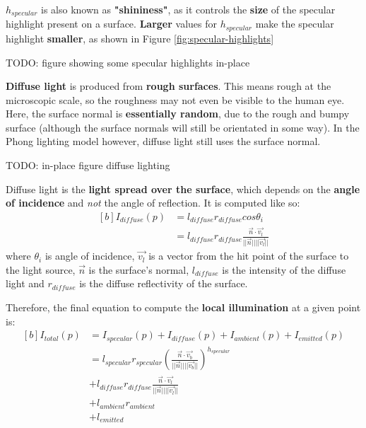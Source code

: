 \documentclass{article}
\begin{document}
$h_{specular}$ is also known as \textbf{"shininess"}, as it controls the \textbf{size} of the specular highlight present on a surface. \textbf{Larger} values for $h_{specular}$ make the specular highlight \textbf{smaller}, as shown in Figure \ref{fig:specular-highlights}

TODO: figure showing some specular highlights in-place

\textbf{Diffuse light} is produced from \textbf{rough surfaces}. This means rough at the microscopic scale, so the roughness may not even be visible to the human eye. Here, the surface normal is \textbf{essentially random}, due to the rough and bumpy surface (although the surface normals will still be orientated in some way). In the Phong lighting model however, diffuse light still uses the surface normal. 

TODO: in-place figure diffuse lighting

Diffuse light is the \textbf{light spread over the surface}, which depends on the \textbf{angle of incidence} and \textit{not} the angle of reflection. It is computed like so:
\begin{equation}
\begin{aligned}[b]
	I_{diffuse}(p) &= l_{diffuse} r_{diffuse} cos \theta_i \\
	&= l_{diffuse} r_{diffuse} \frac{\vec{n} \cdot \vec{v_l}}{||\vec{n}||||\vec{v_l}||}
\end{aligned}
\end{equation}
where $\theta_i$ is angle of incidence, $\vec{v_l}$ is a vector from the hit point of the surface to the light source, $\vec{n}$ is the surface's normal, $l_{diffuse}$ is the intensity of the diffuse light and $r_{diffuse}$ is the diffuse reflectivity of the surface.

Therefore, the final equation to compute the \textbf{local illumination} at a given point is:
\begin{equation}
\begin{aligned}[b]
	I_{total}(p) &= I_{specular}(p) + I_{diffuse}(p) + I_{ambient}(p) + I_{emitted}(p) \\
	&= l_{specular} r_{specular} \left( 
	\frac{\vec{n} \cdot \vec{v_b}}{||\vec{n}||||\vec{v_b}||}
	\right)^{h_{specular}} \\
	&+ l_{diffuse} r_{diffuse} \frac{\vec{n} \cdot \vec{v_l}}{||\vec{n}||||\vec{v_l}||} \\
	&+ l_{ambient} r_{ambient} \\
	&+ l_{emitted} \\
\end{aligned}
\label{eq:phong-lighting-model-full}
\end{equation}
\end{document}
